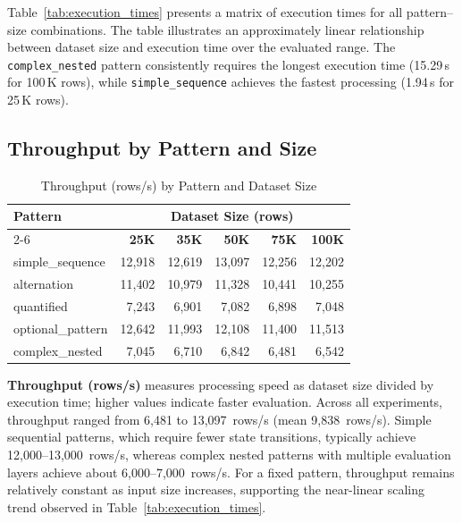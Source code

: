 Table~\ref{tab:execution_times} presents a matrix of execution times
for all pattern--size combinations.  The table illustrates an
approximately linear relationship between dataset size and execution
time over the evaluated range.  The \texttt{complex\_nested} pattern
consistently
requires the longest execution time (15.29\,s for 100\,K rows), while
\texttt{simple\_sequence} achieves the fastest processing
(1.94\,s for 25\,K rows).

\subsection{Throughput by Pattern and Size}
\label{subsec:eval-throughput}

\enlargethispage{2\baselineskip}

{\small
\begin{longtable}{@{\extracolsep{\fill}}lrrrrr}
\caption{Throughput (rows/s) by Pattern and Dataset Size}
\label{tab:throughput} \\
\toprule
\textbf{Pattern} & \multicolumn{5}{c}{\textbf{Dataset Size (rows)}} \\
\cmidrule(lr){2-6}
 & \textbf{25K} & \textbf{35K} & \textbf{50K} & \textbf{75K} & \textbf{100K} \\
\midrule
\endfirsthead
\midrule
\endhead
\bottomrule
\endfoot
simple\_sequence  & 12{,}918 & 12{,}619 & 13{,}097 & 12{,}256 & 12{,}202 \\
alternation       & 11{,}402 & 10{,}979 & 11{,}328 & 10{,}441 & 10{,}255 \\
quantified        &  7{,}243 &  6{,}901 &  7{,}082 &  6{,}898 &  7{,}048 \\
optional\_pattern & 12{,}642 & 11{,}993 & 12{,}108 & 11{,}400 & 11{,}513 \\
complex\_nested   &  7{,}045 &  6{,}710 &  6{,}842 &  6{,}481 &  6{,}542 \\
\end{longtable}
}

\noindent\textbf{Throughput (rows/s)} measures processing speed as
dataset size divided by execution time; higher values indicate faster
evaluation.  Across all experiments, throughput ranged from
6{,}481 to 13{,}097~rows/s (mean 9{,}838~rows/s).  Simple sequential
patterns, which require fewer state transitions, typically achieve
12{,}000--13{,}000~rows/s, whereas complex nested patterns with
multiple evaluation layers achieve about 6{,}000--7{,}000~rows/s.
For a fixed pattern, throughput remains relatively constant as input
size increases, supporting the near-linear scaling trend observed in
Table~\ref{tab:execution_times}.

